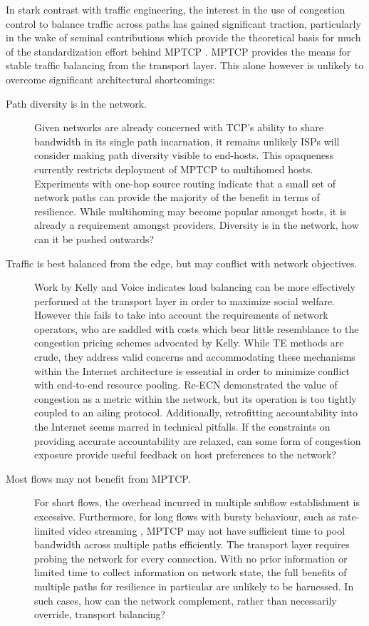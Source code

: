 In stark contrast with traffic engineering, the interest in the use of congestion control to balance traffic across paths has gained significant traction, particularly in the wake of seminal contributions \cite{Key:2007p130,Kelly:2005p140} which provide the theoretical basis for much of the standardization effort behind \ac{MPTCP} \cite{Wischik:2008p137}. 
\ac{MPTCP} provides the means for stable traffic balancing from the transport layer.
This alone however is unlikely to overcome significant architectural shortcomings:

\begin{description}
\item[Path diversity is in the network.]{
    Given networks are already concerned with \ac{TCP}'s ability to share bandwidth in its single path incarnation, it remains unlikely \acp{ISP} will consider making path diversity visible to end-hosts. 
    This opaqueness currently restricts deployment of \ac{MPTCP} to multihomed hosts. 
    Experiments with one-hop source routing \cite{Gummadi:2004p131} indicate that a small set of network paths can provide the majority of the benefit in terms of resilience. 
    While multihoming may become popular amongst hosts, it is already a requirement amongst providers. 
    Diversity is in the network, how can it be pushed outwards?
}

\item[Traffic is best balanced from the edge, but may conflict with network objectives.]{
    Work by Kelly and Voice \cite{Kelly:2005p140} indicates load balancing can be more effectively performed at the transport layer in order to maximize social welfare.
    However this fails to take into account the requirements of network operators, who are saddled with costs which bear little resemblance to the congestion pricing schemes advocated by Kelly.
    While \ac{TE} methods are crude, they address valid concerns and accommodating these mechanisms within the Internet architecture is essential in order to minimize conflict with end-to-end resource pooling. 
    Re-\ac{ECN} \cite{Briscoe:2008p494} demonstrated the value of congestion as a metric within the network, but its operation is too tightly coupled to an ailing protocol. 
    Additionally, retrofitting accountability into the Internet seems marred in technical pitfalls.
    If the constraints on providing accurate accountability are relaxed, can some form of congestion exposure provide useful feedback on host preferences to the network?
}

\item[Most flows may not benefit from \ac{MPTCP}.]{
    For short flows, the overhead incurred in multiple subflow establishment is excessive.
    Furthermore, for long flows with bursty behaviour, such as rate-limited video streaming \cite{Rao:2011p547}, \ac{MPTCP} may not have sufficient time to pool bandwidth across multiple paths efficiently.
    The transport layer requires probing the network for every connection. 
    With no prior information or limited time to collect information on network state, the full benefits of multiple paths for resilience in particular are unlikely to be harnessed.
    In such cases, how can the network complement, rather than necessarily override, transport balancing?
}


\end{description}
